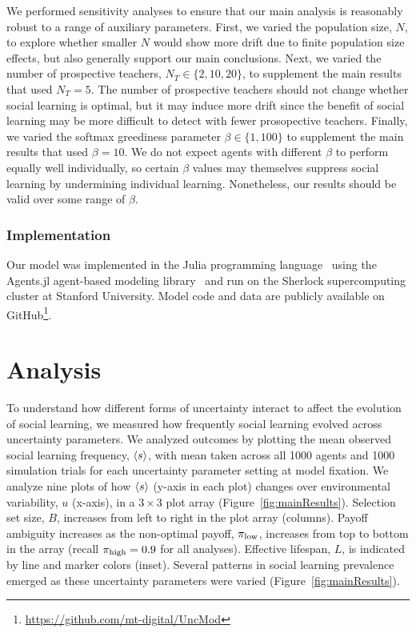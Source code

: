 \documentclass[letterpaper,11.5pt]{scrartcl}
\begin{document}
We performed sensitivity analyses to ensure that our main analysis is reasonably
robust to a range of auxiliary parameters. First,
we varied the population size, $N$, to explore whether smaller $N$ would 
show more drift due to finite population size effects, but also generally support
our main conclusions. Next, we varied the
number of prospective teachers, $N_T \in \{2, 10, 20\}$, 
to supplement the main results that used $N_T = 5$. The number of prospective
teachers should not change whether social learning is optimal, 
but it may induce more drift since the benefit of social learning may
be more difficult to detect with fewer prosopective teachers. Finally, we varied the
softmax greediness parameter $\beta \in \{1, 100\}$ to supplement the main results
that used $\beta = 10$. We do not
expect agents with different $\beta$ to perform equally well 
individually, so certain $\beta$ values may themselves suppress social learning
by undermining individual learning. Nonetheless, our results
should be valid over some range of $\beta$. 


\subsubsection{Implementation}

Our model was implemented in the Julia programming language~\cite{Bezanson2017} 
using the Agents.jl agent-based modeling library~\cite{Datseris2022} and run
on the Sherlock supercomputing cluster at Stanford University. Model code and
data are publicly available on GitHub\footnote{\url{https://github.com/mt-digital/UncMod}}.


\section{Analysis}

To understand how different forms of uncertainty interact to affect the evolution of
social learning, we measured how frequently social learning evolved across
uncertainty parameters. We analyzed outcomes by plotting the mean observed social
learning frequency, $\langle s \rangle$, with mean taken across all 1000 agents and 1000
simulation trials for each uncertainty parameter setting at model fixation.
We analyze nine plots of how $\langle s \rangle$ (y-axis in each plot) changes over 
environmental variability, $u$ (x-axis),
in a $3\times3$ plot array (Figure~\ref{fig:mainResults}). 
Selection set size, $B$, increases from left to right in the plot array (columns). 
Payoff ambiguity increases as the non-optimal payoff, $\pi_{\mathrm{low}}$, increases from 
top to bottom in the array (recall $\pi_{\mathrm{high}}=0.9$ for all analyses).
Effective lifespan, $L$, is indicated by line and marker colors (inset). 
Several patterns in social learning prevalence emerged as 
these uncertainty parameters were varied (Figure~\ref{fig:mainResults}). 
\end{document}
